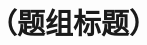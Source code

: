 \documentclass[profile=practice,style=boxed,color=full]{lc-problemset}
\begin{document}
\maketitle
\section{（题组标题）}

\end{document}
